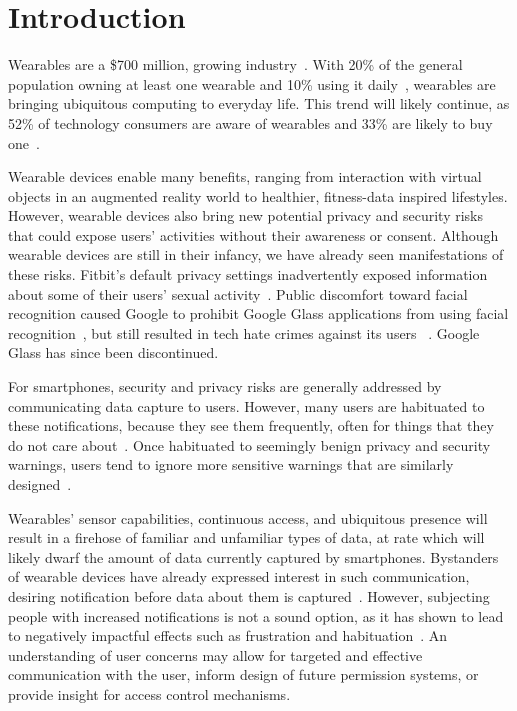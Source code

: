 
\section{Introduction}

Wearables are a \$700 million, growing industry~\cite{cmo}. With 20\% of the general population owning at least one wearable and 10\% using it daily~\cite{WearableStatNews}, wearables are bringing ubiquitous computing to everyday life. This trend will likely continue, as 52\% of technology consumers are aware of wearables and 33\% are likely to buy one~\cite{NPD}.  

Wearable devices enable many benefits, ranging from interaction with virtual objects in an augmented reality world to healthier, fitness-data inspired lifestyles. However, wearable devices also bring new potential privacy and security risks that could expose users' activities without their awareness or consent. Although wearable devices are still in their infancy, we have already seen manifestations of these risks. Fitbit's default privacy settings inadvertently exposed information about some of their users' sexual activity~\cite{Fitbit}. Public discomfort toward facial recognition caused Google to prohibit Google Glass applications from using facial recognition~\cite{GlassDetection}, but still resulted in tech hate crimes against its users ~\cite{1_russell_2014, 16_gross_2014}. Google Glass has since been discontinued.

For smartphones, security and privacy risks are generally addressed by communicating data capture to users. However, many users are habituated to these notifications, because they see them frequently, often for things that they do not care about~\cite{felt2012android}. Once habituated to seemingly benign privacy and security warnings, users tend to ignore more sensitive warnings that are similarly designed~\cite{Egelman08}. 

Wearables' sensor capabilities, continuous access, and ubiquitous presence will result in a firehose of familiar and unfamiliar types of data, at rate which will likely dwarf the amount of data currently captured by smartphones. Bystanders of wearable devices have already expressed interest in such communication, desiring notification before data about them is captured~\cite{denning2014situ}. However, subjecting people with increased notifications is not a sound option, as it has shown to lead to negatively impactful effects such as frustration and habituation~\cite{bohme2011security}. An understanding of user concerns may allow for targeted and effective communication with the user, inform design of future permission systems, or provide insight for access control mechanisms. 

